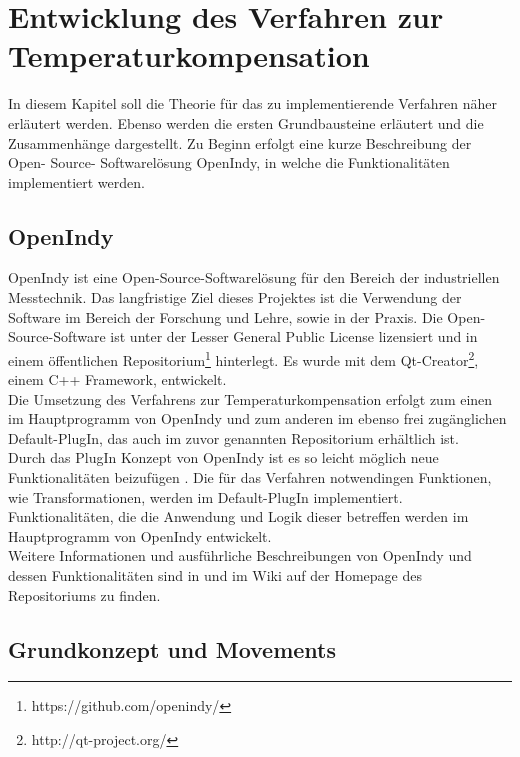 \chapter{Entwicklung des Verfahren zur Temperaturkompensation}\label{chap:entwicklung}

In diesem Kapitel soll die Theorie für das zu implementierende Verfahren näher erläutert werden. Ebenso werden die ersten Grundbausteine erläutert und die Zusammenhänge dargestellt. Zu Beginn erfolgt eine kurze Beschreibung der Open- Source- Softwarelösung OpenIndy, in welche die Funktionalitäten implementiert werden.

\section{OpenIndy}\label{sec:openindy}

OpenIndy ist eine Open-Source-Softwarelösung für den Bereich der industriellen Messtechnik. Das langfristige Ziel dieses Projektes ist die Verwendung der Software im Bereich der Forschung und Lehre, sowie in der Praxis. Die Open-Source-Software ist unter der Lesser General Public License lizensiert und in einem öffentlichen Repositorium\footnote{https://github.com/openindy/} hinterlegt. Es wurde mit dem Qt-Creator\footnote{http://qt-project.org/}, einem C++ Framework, entwickelt.\\
Die Umsetzung des Verfahrens zur Temperaturkompensation erfolgt zum einen im Hauptprogramm von OpenIndy und zum anderen im ebenso frei zugänglichen \glqq Default-PlugIn\grqq, das auch im zuvor genannten Repositorium erhältlich ist.\\
Durch das PlugIn Konzept von OpenIndy ist es so leicht möglich neue Funktionalitäten beizufügen \cite{Wambach2014}. Die für das Verfahren notwendingen Funktionen, wie Transformationen, werden im Default-PlugIn implementiert. Funktionalitäten, die die Anwendung und Logik dieser betreffen werden im Hauptprogramm von OpenIndy entwickelt.\\
Weitere Informationen und ausführliche Beschreibungen von OpenIndy und dessen Funktionalitäten sind in \cite{Wambach2014} und im Wiki auf der Homepage des Repositoriums zu finden.

\section{Grundkonzept und Movements}\label{sec:grundkonzept}

